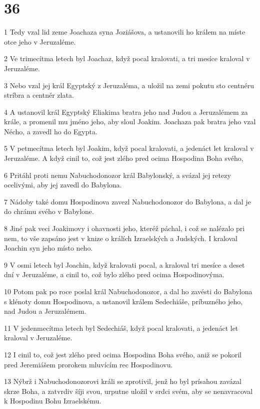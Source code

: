 \chapter{36}

\par 1 Tedy vzal lid zeme Joachaza syna Joziášova, a ustanovili ho králem na míste otce jeho v Jeruzaléme.
\par 2 Ve trimecítma letech byl Joachaz, když pocal kralovati, a tri mesíce kraloval v Jeruzaléme.
\par 3 Nebo vzal jej král Egyptský z Jeruzaléma, a uložil na zemi pokutu sto centnéru stríbra a centnér zlata.
\par 4 A ustanovil král Egyptský Eliakima bratra jeho nad Judou a Jeruzalémem za krále, a promenil mu jméno jeho, aby sloul Joakim. Joachaza pak bratra jeho vzal Nécho, a zavedl ho do Egypta.
\par 5 V petmecítma letech byl Joakim, když pocal kralovati, a jedenáct let kraloval v Jeruzaléme. A když cinil to, což jest zlého pred ocima Hospodina Boha svého,
\par 6 Pritáhl proti nemu Nabuchodonozor král Babylonský, a svázal jej retezy ocelivými, aby jej zavedl do Babylona.
\par 7 Nádoby také domu Hospodinova zavezl Nabuchodonozor do Babylona, a dal je do chrámu svého v Babylone.
\par 8 Jiné pak veci Joakimovy i ohavnosti jeho, kteréž páchal, i což se nalézalo pri nem, to vše zapsáno jest v knize o králích Izraelských a Judských. I kraloval Joachin syn jeho místo neho.
\par 9 V osmi letech byl Joachin, když kralovati pocal, a kraloval tri mesíce a deset dní v Jeruzaléme, a cinil to, což bylo zlého pred ocima Hospodinovýma.
\par 10 Potom pak po roce poslal král Nabuchodonozor, a dal ho zavésti do Babylona s klénoty domu Hospodinova, a ustanovil králem Sedechiáše, príbuzného jeho, nad Judou a Jeruzalémem.
\par 11 V jedenmecítma letech byl Sedechiáš, když pocal kralovati, a jedenáct let kraloval v Jeruzaléme.
\par 12 I cinil to, což jest zlého pred ocima Hospodina Boha svého, aniž se pokoril pred Jeremiášem prorokem mluvícím rec Hospodinovu.
\par 13 Nýbrž i Nabuchodonozorovi králi se zprotivil, jenž ho byl prísahou zavázal skrze Boha, a zatvrdiv šíji svou, urputne uložil v srdci svém, aby se nenavracoval k Hospodinu Bohu Izraelskému.
